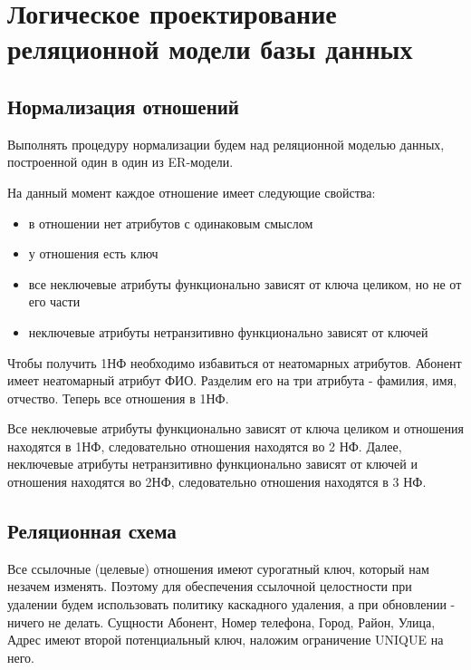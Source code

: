 \documentclass{report}
\begin{document}
\chapter{Логическое проектирование реляционной модели базы данных}

\section{Нормализация отношений}

Выполнять процедуру нормализации будем над реляционной моделью 
данных, построенной один в один из ER-модели. 

На данный момент 
каждое отношение имеет следующие свойства:
\begin{itemize}
    \item в отношении нет атрибутов с одинаковым смыслом
    \item у отношения есть ключ
    \item все неключевые атрибуты функционально зависят от ключа целиком, но не от его части
    \item неключевые атрибуты нетранзитивно функционально зависят от ключей
\end{itemize} 
Чтобы получить 1НФ необходимо избавиться от неатомарных атрибутов. 
Абонент имеет неатомарный атрибут ФИО. Разделим его на три атрибута - 
фамилия, имя, отчество. Теперь все отношения в 1НФ.

Все неключевые атрибуты функционально зависят от ключа целиком и отношения
находятся в 1НФ, следовательно отношения находятся во 2 НФ. Далее, неключевые 
атрибуты нетранзитивно функционально зависят от ключей и отношения находятся
во 2НФ, следовательно отношения находятся в 3 НФ.

\section{Реляционная схема}

Все ссылочные (целевые) отношения имеют сурогатный ключ, который
нам незачем изменять. Поэтому для обеспечения ссылочной целостности
при удалении будем использовать политику каскадного удаления, 
а при обновлении - ничего не делать. Сущности Абонент, Номер телефона,
Город, Район, Улица, Адрес имеют второй потенциальный ключ,
наложим ограничение UNIQUE на него.
\end{document}
